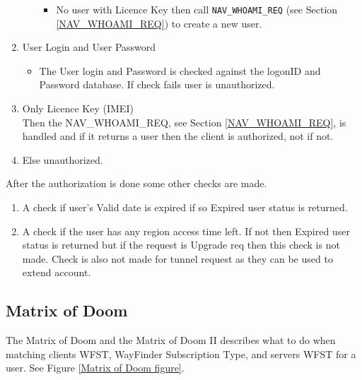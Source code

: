 \begin{enumerate}
\begin{itemize}
\begin{itemize}
    \item No user with Licence Key then call {\tt NAV\_WHOAMI\_REQ}
      (see Section \ref{NAV_WHOAMI_REQ}) to create a new user.
    \end{itemize}
  \end{itemize}
\item User Login and User Password
  \begin{itemize}
    \item The User login and Password is checked against the logonID and 
      Password database. If check fails user is unauthorized.
  \end{itemize}
\item Only Licence Key (IMEI) \\
  Then the NAV\_WHOAMI\_REQ, see Section \ref{NAV_WHOAMI_REQ}, 
  is handled and if it returns a user then the client is authorized,
  not if not.

\item Else unauthorized.

\end{enumerate}

After the authorization is done some other checks are made.

\begin{enumerate}
    \item A check if user's Valid date is expired if so Expired user status 
      is returned.
    \item A check if the user has any region access time left. If not then
      Expired user status is returned but if the request is Upgrade req then 
      this check is not made. Check is also not made for tunnel request
      as they can be used to extend account.
\end{enumerate}


\subsection{Matrix of Doom}
\label{Matrix of Doom}

The Matrix of Doom and the Matrix of Doom II describes what to do when 
matching clients WFST, WayFinder Subscription Type, and servers WFST for 
a user. See Figure \ref{Matrix of Doom figure}.


